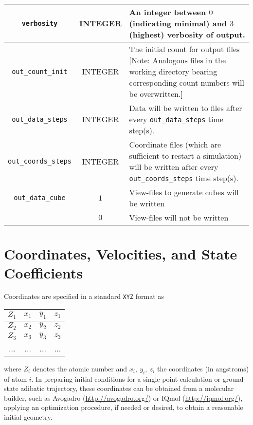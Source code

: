 \documentclass[12pt,letter,footinclude=true,headinclude=true,hyphens]{book} %
\begin{document}
    \begin{tabular}{ | c | c | p{7cm} | }
    \hline
    \texttt{verbosity} & INTEGER & An integer between $0$ (indicating minimal) and $3$ (highest) verbosity of output. \\ \hline
    \texttt{out\_count\_init} & INTEGER & The initial count for output files [Note: Analogous files in the working directory bearing corresponding count numbers will be overwritten.]\\ \hline
    \texttt{out\_data\_steps} & INTEGER & Data will be written to files after every \texttt{out\_data\_steps} time step(s). \\ \hline
    \texttt{out\_coords\_steps} & INTEGER & Coordinate files (which are sufficient to restart a simulation) will be written after every \texttt{out\_coords\_steps} time step(s). \\ \hline
    \texttt{out\_data\_cube} & $1$ & View-files to generate cubes will be written \\
    & $0$ & View-files will not be written \\ \hline
    \end{tabular}
   
    \section{Coordinates, Velocities, and State Coefficients}
    
    Coordinates are specified in a standard \texttt{XYZ} format as
    
    \begin{center}
    \begin{tabular}{ | c | c | c | c | } \hline
    $Z_1$ & $x_1$ & $y_1$ & $z_1$ \\ \hline
    $Z_2$ & $x_2$ & $y_2$ & $z_2$ \\ \hline
    $Z_3$ & $x_3$ & $y_3$ & $z_3$ \\ \hline
    ... & ... & ... & ... \\ \hline
    \end{tabular}
    \end{center}
    
    where $Z_i$ denotes the atomic number and $x_i,\ y_i,\ z_i$ the coordinates (in angstroms) of atom $i$. In preparing initial conditions for a single-point calculation or ground-state adibatic trajectory, these coordinates can be obtained from a molecular builder, such as Avogadro (\url{http://avogadro.org/}) or IQmol (\url{http://iqmol.org/}), applying an optimization procedure, if needed or desired, to obtain a reasonable initial geometry.
    
\end{document}
